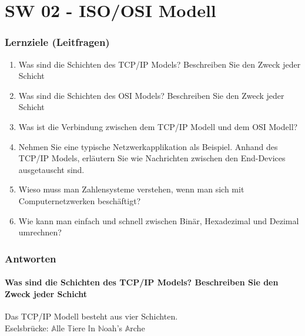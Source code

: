 \part{SW 02 - ISO/OSI Modell}
\section{Lernziele (Leitfragen)}
\begin{enumerate}
    \item Was sind die Schichten des TCP/IP Models? Beschreiben Sie den Zweck jeder Schicht
    \item Was sind die Schichten des OSI Models? Beschreiben Sie den Zweck jeder Schicht
    \item Was ist die Verbindung zwischen dem TCP/IP Modell und dem OSI Modell?
    \item Nehmen Sie eine typische Netzwerkapplikation als Beispiel. Anhand des TCP/IP Models, erläutern Sie wie Nachrichten zwischen den End-Devices ausgetauscht sind.
    \item Wieso muss man Zahlensysteme verstehen, wenn man sich mit Computernetzwerken beschäftigt?
    \item Wie kann man einfach und schnell zwischen Binär, Hexadezimal und Dezimal umrechnen?
\end{enumerate}

\section{Antworten}
\subsection*{Was sind die Schichten des TCP/IP Models? Beschreiben Sie den Zweck jeder Schicht}
Das TCP/IP Modell besteht aus vier Schichten.\\
Eselsbrücke: \underline{$\mathbb{A}$}lle \underline{$\mathbb{T}$}iere \underline{$\mathbb{I}$}n \underline{$\mathbb{N}$}oah's \underline{$\mathbb{A}$}rche\\

